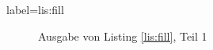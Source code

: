 \begin{lfgwcode}{label={lis:fill}}



\answerline[Antwort] %
\end{lfgwcode}

\begin{figure}[b]
\caption{Ausgabe von Listing \ref{lis:fill}, Teil 1}\label{fig:fill1}
\end{figure}

